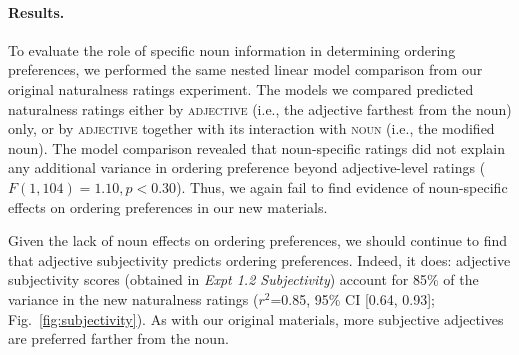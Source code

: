 \documentclass[12pt]{article}
\begin{document}
\paragraph{Results.}

To evaluate the role of specific noun information in determining ordering preferences, we performed the same nested linear model comparison from our original naturalness ratings experiment. The models we compared predicted naturalness ratings either by \textsc{adjective} (i.e., the adjective farthest from the noun) only, or by \textsc{adjective} together with its interaction with \textsc{noun} (i.e., the modified noun).
The model comparison revealed that noun-specific ratings did not explain any additional variance in ordering preference beyond adjective-level ratings ($F(1,104) = 1.10, p < 0.30$).  Thus, we again fail to find evidence of noun-specific effects on ordering preferences in our new materials. 


%
%
%
%
%


Given the lack of noun effects on ordering preferences, we should continue to find that adjective subjectivity predicts ordering preferences. Indeed, it does: adjective subjectivity scores (obtained in \emph{Expt 1.2 Subjectivity}) account for  85\% of the variance in the new naturalness ratings ($r^2${=}0.85, 95\% CI [0.64,  0.93]; Fig.~\ref{fig:subjectivity}). 
As with our original materials, more subjective adjectives are preferred farther from the noun.
\end{document}

